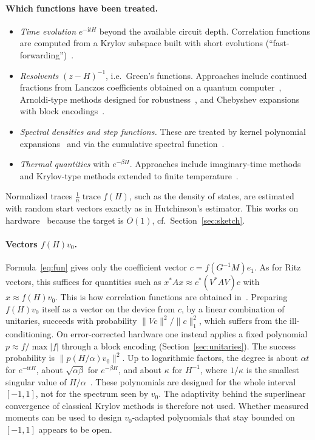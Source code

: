 \documentclass[11pt,a4paper]{article}
\begin{document}
\paragraph{Which functions have been treated.}
\begin{itemize}
\item \emph{Time evolution} $e^{-\mathrm{i}tH}$ beyond the available circuit
  depth. Correlation functions are computed from a Krylov subspace built
  with short evolutions (``fast-forwarding'')~\cite{CDG22}.
\item \emph{Resolvents} $(z-H)^{-1}$, i.e.\ Green's functions. Approaches
  include continued fractions from Lanczos coefficients obtained on a
  quantum computer~\cite{Baker21}, Arnoldi-type methods designed for
  robustness~\cite{NB26}, and Chebyshev expansions with block
  encodings~\cite{Rall20}.
\item \emph{Spectral densities and step functions.} These are treated by
  kernel polynomial expansions~\cite{Rall20} and via the cumulative
  spectral function~\cite{LT22}.
\item \emph{Thermal quantities} with $e^{-\beta H}$. Approaches include
  imaginary-time methods~\cite{Motta20} and Krylov-type methods extended
  to finite temperature~\cite{NB26}.
\end{itemize}
Normalized traces $\frac1n\operatorname{trace}f(H)$, such as the density of
states, are estimated with random start vectors exactly as in
Hutchinson's estimator. This works on hardware~\cite{Summer23} because the
target is $O(1)$, cf.\ Section~\ref{sec:sketch}.

\paragraph{Vectors $f(H)v_0$.} Formula~\eqref{eq:fun} gives only the
coefficient vector $c=f(G^{-1}M)e_1$. As for Ritz vectors, this suffices
for quantities such as $x^*Ax\approx c^*(V^*AV)c$ with $x\approx f(H)v_0$. This
is how correlation functions are obtained in~\cite{CDG22}. Preparing
$f(H)v_0$ itself as a vector on the device from $c$, by a linear
combination of unitaries, succeeds with probability $\|Vc\|^2/\|c\|_1^2$,
which suffers from the ill-conditioning. On error-corrected hardware one
instead applies a fixed polynomial $p\approx f/\max|f|$ through a block
encoding (Section~\ref{sec:unitaries}). The success probability is
$\|p(H/\alpha)v_0\|^2$. Up to logarithmic factors, the degree is about $\alpha t$
for $e^{-\mathrm{i}tH}$, about $\sqrt{\alpha\beta}$ for $e^{-\beta H}$, and about
$\kappa$ for $H^{-1}$, where $1/\kappa$ is the smallest singular value of
$H/\alpha$~\cite{GSLW19}. These polynomials are designed for the whole
interval $[-1,1]$, not for the spectrum seen by $v_0$. The adaptivity
behind the superlinear convergence of classical Krylov methods is
therefore not used. Whether measured moments can be used to design
$v_0$-adapted polynomials that stay bounded on $[-1,1]$ appears to be
open.
\end{document}
